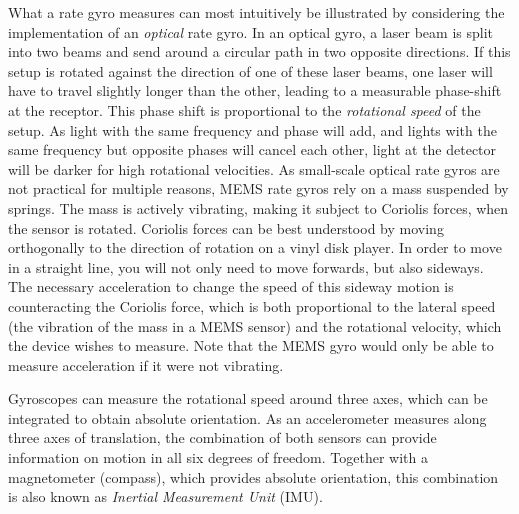 What a rate gyro  measures can most intuitively be illustrated by considering the implementation of an \emph{optical} rate gyro. In an optical gyro, a laser beam is split into two beams and send around a circular path in two opposite directions. If this setup is rotated against the direction of one of these laser beams, one laser will have to travel slightly longer than the other, leading to a measurable phase-shift at the receptor. This phase shift is proportional to the \emph{rotational speed} of the setup. As light with the same frequency and phase will add, and lights with the same frequency but opposite phases will cancel each other, light at the detector will be darker for high rotational velocities. As small-scale optical rate gyros are not practical for multiple reasons, MEMS rate gyros rely on a mass suspended by springs. The mass is actively vibrating, making it subject to Coriolis forces, when the sensor is rotated. Coriolis forces can be best understood by moving orthogonally to the direction of rotation on a vinyl disk player. In order to move in a straight line, you will not only need to move forwards, but also sideways. The necessary acceleration to change the speed of this sideway motion is counteracting the Coriolis force, which is both proportional to the lateral speed (the vibration of the mass in a MEMS sensor) and the rotational velocity, which the device wishes to measure. Note that the MEMS gyro would only be able to measure acceleration if it were not vibrating.

Gyroscopes can measure the rotational speed around three axes, which can be integrated to obtain absolute orientation. As an accelerometer measures along three axes of translation, the combination of both sensors can provide information on motion in all six degrees of freedom. Together with a magnetometer (compass), which provides absolute orientation, this combination is also known as \emph{Inertial Measurement Unit} (IMU). 

